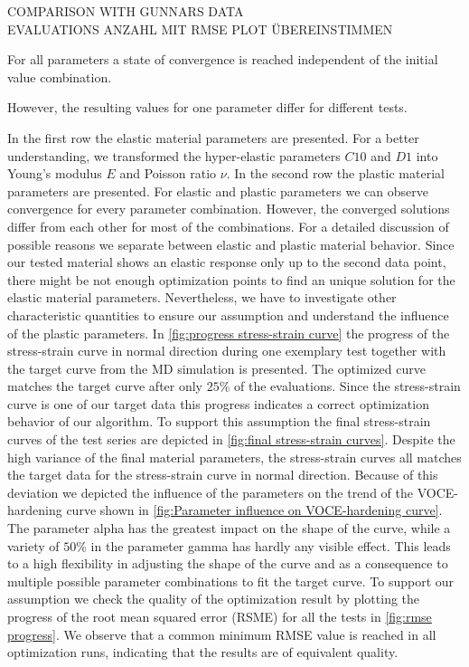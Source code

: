 COMPARISON WITH GUNNARS DATA\\
EVALUATIONS ANZAHL MIT RMSE PLOT ÜBEREINSTIMMEN


For all parameters a state of convergence is reached independent of the initial value combination. 

However, the resulting values for one parameter differ for different tests. 


    In the first row the elastic material parameters are presented. For a better understanding, we transformed the hyper-elastic parameters \(C10\) and \(D1\) into Young's modulus \(E\) and Poisson ratio \(\nu\). In the second row the plastic material parameters are presented. For elastic and plastic parameters we can observe convergence for every parameter combination. However, the converged solutions differ from each other for most of the combinations. 
For a detailed discussion of possible reasons we separate between elastic and plastic material behavior. Since our tested material shows an elastic response only up to the second data point, there might be not enough optimization points to find an unique solution for the elastic material parameters. Nevertheless, we have to investigate other characteristic quantities to ensure our assumption and understand the influence of the plastic parameters. In \autoref{fig:progress stress-strain curve} the progress of the stress-strain curve in normal direction during one exemplary test together with the target curve from the MD simulation is presented. The optimized curve matches the target curve after only  \(25 \%\) of the evaluations. Since the stress-strain curve is one of our target data this progress indicates a correct optimization behavior of our algorithm. To support this assumption the final stress-strain curves of the test series are depicted in \autoref{fig:final stress-strain curves}. Despite the high variance of the final material parameters, the stress-strain curves all matches the target data for the stress-strain curve in normal direction. Because of this deviation we depicted the influence of the parameters on the trend of the VOCE-hardening curve shown in \autoref{fig:Parameter influence on VOCE-hardening curve}. The parameter alpha has the greatest impact on the shape of the curve, while a variety of \(50\%\) in the parameter gamma has hardly any visible effect. This leads to a high flexibility in adjusting the shape of the curve and as a consequence to multiple possible parameter combinations to fit the target curve. To support our assumption we check the quality of the optimization result by plotting the progress of the root mean squared error (RSME) for all the tests in \autoref{fig:rmse progress}. We observe that a common minimum RMSE value is reached in all optimization runs, indicating that the results are of equivalent quality. 
